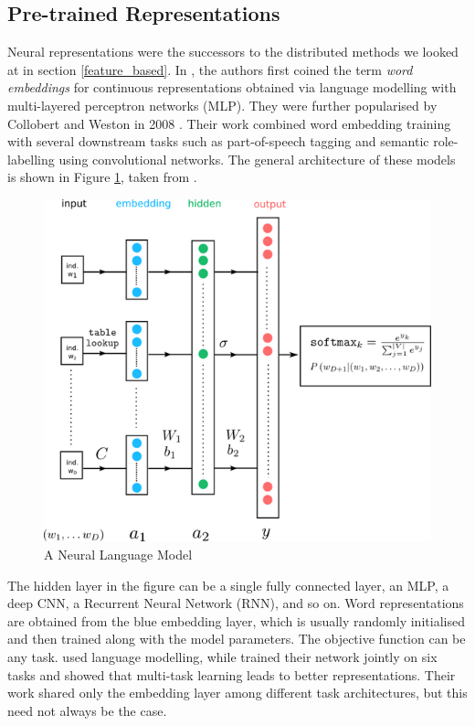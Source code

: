 \documentclass[12pt]{report}
\begin{document}
	\subsection{Pre-trained Representations}
	Neural representations were the successors to the distributed methods we looked at in section \ref{feature_based}. In \citep{bengio2003neural}, the authors first coined the term \textit{word embeddings} for continuous representations obtained via language modelling with multi-layered perceptron networks (MLP). They were further popularised by Collobert and Weston in 2008 \citep{collobert2008unified}. Their work combined word embedding training with several downstream tasks such as part-of-speech tagging and semantic role-labelling using convolutional networks. The general architecture of these models is shown in Figure \ref{fig_2}, taken from \citep{DSC:2016}.
	\begin{figure}[h] 
		\centering
		\caption{A Neural Language Model}
		\label{fig_2}
		\includegraphics[]{nlm}
	\end{figure} 
	The hidden layer in the figure can be a single fully connected layer, an MLP, a deep CNN, a Recurrent Neural Network (RNN), and so on. Word representations are obtained from the blue embedding layer, which is usually randomly initialised and then trained along with the model parameters. The objective function can be any task. \citep{bengio2003neural} used language modelling, while \citep{collobert2008unified} trained their network jointly on six tasks and showed that multi-task learning leads to better representations. Their work shared only the embedding layer among different task architectures, but this need not always be the case.
	
\end{document}
